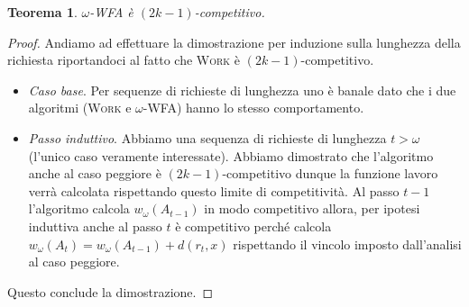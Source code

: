 \documentclass[a4paper, 11pt]{article}
\begin{document}
\newtheorem{competitivity}{Teorema}
\begin{competitivity}
$\omega$-WFA è $(2k - 1)$-competitivo.
\end{competitivity}
\begin{proof}
Andiamo ad effettuare la dimostrazione per induzione sulla lunghezza della 
richiesta riportandoci al fatto che \textsc{Work} è $(2k - 1)$-competitivo.
\begin{itemize}
    \item \emph{Caso base}. Per sequenze di richieste di lunghezza uno è banale
    dato che i due algoritmi (\textsc{Work} e $\omega$-WFA) hanno lo stesso 
    comportamento.
    \item \emph{Passo induttivo}. Abbiamo una sequenza di richieste di lunghezza
    $t > \omega$ (l'unico caso veramente interessate). Abbiamo dimostrato che 
    l'algoritmo anche al caso peggiore è $(2k - 1)$-competitivo dunque la 
    funzione lavoro verrà calcolata rispettando questo limite di competitività.
    Al passo $t - 1$ l'algoritmo calcola $w_\omega(A_{t-1})$ in modo competitivo
    allora, per ipotesi induttiva anche al passo $t$ è competitivo perché calcola
    $w_\omega(A_t) = w_\omega(A_{t-1}) + d(r_t, x)$ rispettando il vincolo 
    imposto dall'analisi al caso peggiore.
    
\end{itemize}
Questo conclude la dimostrazione.
\end{proof}



\end{document}

